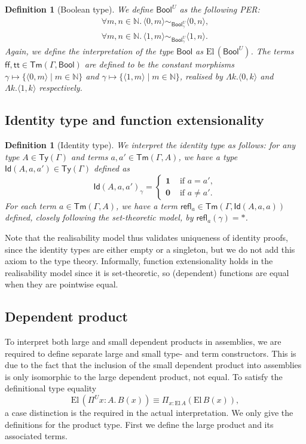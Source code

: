 \documentclass[10pt,a4paper]{article}
\newtheorem{definition}[theorem]{Definition}
\theoremstyle{definition}
\theoremstyle{remark}
\renewcommand{\.}{.\,} %
\renewcommand{\:}{:} %
\newcommand{\bN}{\mathbb{N}}
\newcommand{\El}{\mathrm{El}\,}
\newcommand{\Id}{\mathsf{Id}}
\newcommand{\0}{\mathbf{0}}
\newcommand{\1}{\mathbf{1}}
\newcommand{\refl}{\mathsf{refl}}
\newcommand\<\langle
\renewcommand\>\rangle
\newcommand{\Ty}{\mathsf{Ty}}
\newcommand{\Tm}{\mathsf{Tm}}
\newcommand{\U}{U}
\theoremstyle{remark}
\begin{document}
\begin{definition}[Boolean type]
We define $\mathsf{Bool}^\U$ as the following PER:
\begin{align*}
    \forall m, n \in \bN \. \langle 0, m \rangle \sim_{\mathsf{Bool}^\U_\gamma} \langle 0, n \rangle, \\
    \forall m, n \in \bN \. \langle 1, m \rangle \sim_{\mathsf{Bool}^\U_\gamma} \langle 1, n \rangle.
\end{align*}
Again, we define the interpretation of the type $\mathsf{Bool}$ as $\El (\mathsf{Bool}^\U)$. The terms $\mathsf{ff, tt} \in \Tm(\Gamma, \mathsf{Bool})$ are defined to be the constant morphisms $\gamma \mapsto \{\langle 0, m \rangle \mid m \in \bN \}$ and $\gamma \mapsto \{\langle 1, m \rangle \mid m \in \bN \}$, realised by $\Lambda k . \langle 0, k \rangle$ and $\Lambda k . \langle 1, k \rangle$ respectively.
\end{definition}

\subsection{Identity type and function extensionality}
\begin{definition}[Identity type]
We interpret the identity type as follows: for any type $A \in \Ty(\Gamma)$ and terms $a, a' \in \Tm(\Gamma, A)$, we have a type $\Id(A, a, a') \in \Ty(\Gamma)$ defined as 
\[
\Id(A, a, a')_\gamma = \begin{cases}
	\1 & \text{ if $a = a'$},\\
	\0 & \text{ if $a \neq a'$}.
\end{cases}
\]
For each term $a \in \Tm(\Gamma, A)$, we have a term $\refl_a \in \Tm(\Gamma, \Id(A, a, a))$ defined, closely following the set-theoretic model, by $\refl_a(\gamma) = *$.
\end{definition}

Note that the realisability model thus validates uniqueness of identity proofs, since the identity types are either empty or a singleton, but we do not add this axiom to the type theory. 
Informally, function extensionality holds in the realisability model since it is set-theoretic, so (dependent) functions are equal when they are pointwise equal.

\subsection{Dependent product}
To interpret both large and small dependent products in assemblies, we are required to define separate large and small type- and term constructors. This is due to the fact that the inclusion of the small dependent product into assemblies is only isomorphic to the large dependent product, not equal.
To satisfy the definitional type equality
\[
\El (\Pi^U x:A.\, B(x)) \equiv \Pi_{x:\El A} (\El B(x)),
\]
a case distinction is the required in the actual interpretation. We only give the definitions for the product type. First we define the large product and its associated terms.
\end{document}
